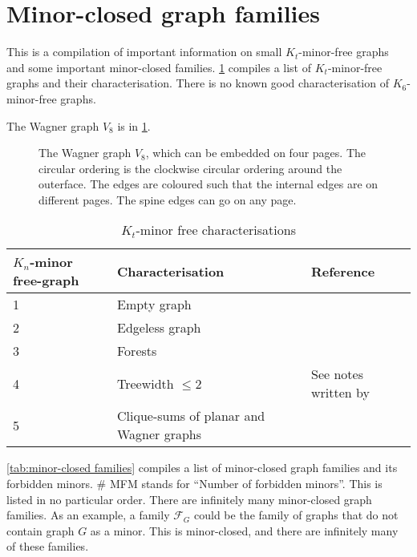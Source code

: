 \section{Minor-closed graph families}\label{sec:minor_closed_families}
This is a compilation of important information on small $K_t$-minor-free graphs and some important minor-closed families. \cref{tab:kt_minor_free} compiles a list of $K_t$-minor-free graphs and their characterisation. There is no known good characterisation of $K_6$-minor-free graphs. 

The Wagner graph $V_8$ is in \cref{fig:wagner}. 
\begin{figure}[h!]
	\centering
	\begin{tikzpicture}[thick,scale=1.5, every node/.style={scale=2}]
		
	\end{tikzpicture}
	\caption[Wagner graph]{The Wagner graph $V_8$, which can be embedded on four pages. The circular ordering is the clockwise circular ordering around the outerface. The edges are coloured such that the internal edges are on different pages. The spine edges can go on any page.}\label{fig:wagner}
\end{figure}

\begin{table}[h!]
    \centering
    \caption{$K_t$-minor free characterisations}\label{tab:kt_minor_free}
    \begin{tabular*}{\textwidth}{@{}lll@{}}
        \toprule
        $K_n$-minor free-graph  & Characterisation  & Reference \\
        \midrule
        1                       & Empty graph       &           \\
        2                       & Edgeless graph    &           \\
        3                       & Forests           &           \\
        4                       & Treewidth $\leq 2$&  See notes written by {\textcite{norinMath599GraphMinors2017}}         \\
        5                       & Clique-sums of planar and Wagner graphs & {\textcite{wagnerUeberEigenschaftEbenen1937}}\\
        \bottomrule
    \end{tabular*}
\end{table}

\cref{tab:minor-closed families} compiles a list of minor-closed graph families and its forbidden minors. \# MFM stands for ``Number of forbidden minors''.
This is listed in no particular order. There are infinitely many minor-closed graph families. As an example, a family $\mathcal{F}_G$ could be the family of graphs that do not contain graph $G$ as a minor. This is minor-closed, and there are infinitely many of these families.

